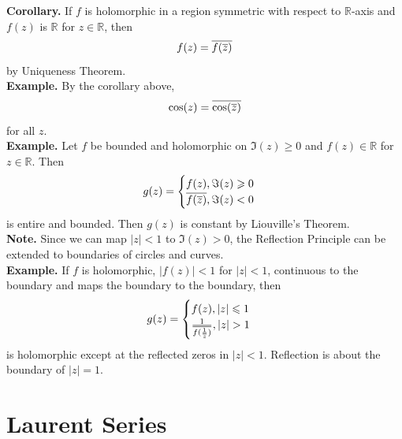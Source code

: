 \documentclass[11pt]{article}
\begin{document}
\newline
\textbf{Corollary.} 
If $f$ is holomorphic in a region symmetric with respect to $\mathbb{R}$-axis and $f(z)$ is $\mathbb{R}$ for $z \in \mathbb{R}$, then
$$f(z) = \overline{f(\overline{z})} $$
by Uniqueness Theorem. \\
\newpage
\textbf{Example.} By the corollary above, 
$$\cos(z) = \overline{\cos(\overline{z})}$$ 
for all $z$. \\
\newline
\textbf{Example.} Let $f$ be bounded and holomorphic on $\Im(z) \geqslant 0$ and $f(z) \in \mathbb{R}$ for $z \in \mathbb{R}$. Then
$$
g(z) = 
\begin{cases}
	f(z), \Im(z) \geqslant 0 \\
	\overline{f(\overline{z})}, \Im(z) < 0\\ 
\end{cases}
$$
is entire and bounded. Then $g(z)$ is constant by Liouville's Theorem. \\
\newline
\textbf{Note.} Since we can map $|z| < 1$ to $\Im(z) > 0$, the Reflection Principle can be extended to boundaries of circles and curves. \\
\newline
\textbf{Example.} If $f$ is holomorphic, $|f(z)| < 1$ for $|z| < 1$, continuous to the boundary and maps the boundary to the boundary, then 
$$
g(z) = 
\begin{cases}
	f(z), |z| \leqslant 1 \\ 
	\frac{1}{\overline{f(\frac{1}{\overline{z}})}}, |z| > 1\\
\end{cases}
$$
is holomorphic except at the reflected zeros in $|z| < 1$. Reflection is about the boundary of $|z| = 1$. 

\newpage
\section{Laurent Series}
\end{document}

